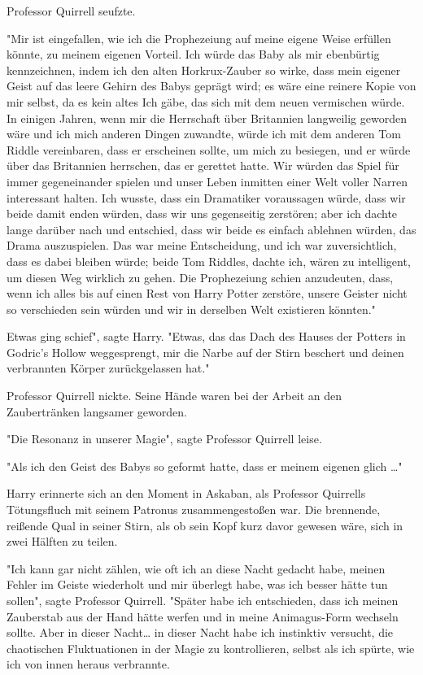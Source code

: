 {Professor Quirrell seufzte.

"Mir ist eingefallen, wie ich die Prophezeiung auf meine eigene Weise erfüllen könnte, zu meinem eigenen Vorteil. Ich würde das Baby als mir ebenbürtig kennzeichnen, indem ich den alten Horkrux-Zauber so wirke, dass mein eigener Geist auf das leere Gehirn des Babys geprägt wird; es wäre eine reinere Kopie von mir selbst, da es kein altes Ich gäbe, das sich mit dem neuen vermischen würde. In einigen Jahren, wenn mir die Herrschaft über Britannien langweilig geworden wäre und ich mich anderen Dingen zuwandte, würde ich mit dem anderen Tom Riddle vereinbaren, dass er erscheinen sollte, um mich zu besiegen, und er würde über das Britannien herrschen, das er gerettet hatte. Wir würden das Spiel für immer gegeneinander spielen und unser Leben inmitten einer Welt voller Narren interessant halten. Ich wusste, dass ein Dramatiker voraussagen würde, dass wir beide damit enden würden, dass wir uns gegenseitig zerstören; aber ich dachte lange darüber nach und entschied, dass wir beide es einfach ablehnen würden, das Drama auszuspielen. Das war meine Entscheidung, und ich war zuversichtlich, dass es dabei bleiben würde; beide Tom Riddles, dachte ich, wären zu intelligent, um diesen Weg wirklich zu gehen. Die Prophezeiung schien anzudeuten, dass, wenn ich alles bis auf einen Rest von Harry Potter zerstöre, unsere Geister nicht so verschieden sein würden und wir in derselben Welt existieren könnten."

Etwas ging schief", sagte Harry. "Etwas, das das Dach des Hauses der Potters in Godric's Hollow weggesprengt, mir die Narbe auf der Stirn beschert und deinen verbrannten Körper zurückgelassen hat."

Professor Quirrell nickte. Seine Hände waren bei der Arbeit an den Zaubertränken langsamer geworden.

"Die Resonanz in unserer Magie", sagte Professor Quirrell leise.

"Als ich den Geist des Babys so geformt hatte, dass er meinem eigenen glich …"

Harry erinnerte sich an den Moment in Askaban, als Professor Quirrells Tötungsfluch mit seinem Patronus zusammengestoßen war. Die brennende, reißende Qual in seiner Stirn, als ob sein Kopf kurz davor gewesen wäre, sich in zwei Hälften zu teilen.

"Ich kann gar nicht zählen, wie oft ich an diese Nacht gedacht habe, meinen Fehler im Geiste wiederholt und mir überlegt habe, was ich besser hätte tun sollen", sagte Professor Quirrell. "Später habe ich entschieden, dass ich meinen Zauberstab aus der Hand hätte werfen und in meine Animagus-Form wechseln sollte. Aber in dieser Nacht… in dieser Nacht habe ich instinktiv versucht, die chaotischen Fluktuationen in der Magie zu kontrollieren, selbst als ich spürte, wie ich von innen heraus verbrannte.

}
